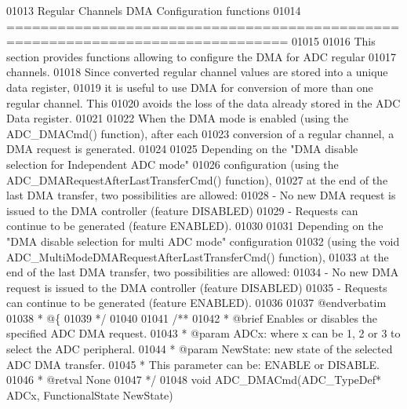 \begin{DoxyCode}
01013 \textcolor{comment}{                   Regular Channels DMA Configuration functions}
01014 \textcolor{comment}{ ===============================================================================  }
01015 \textcolor{comment}{}
01016 \textcolor{comment}{  This section provides functions allowing to configure the DMA for ADC regular }
01017 \textcolor{comment}{  channels.}
01018 \textcolor{comment}{  Since converted regular channel values are stored into a unique data register, }
01019 \textcolor{comment}{  it is useful to use DMA for conversion of more than one regular channel. This }
01020 \textcolor{comment}{  avoids the loss of the data already stored in the ADC Data register. }
01021 \textcolor{comment}{  }
01022 \textcolor{comment}{  When the DMA mode is enabled (using the ADC\_DMACmd() function), after each}
01023 \textcolor{comment}{  conversion of a regular channel, a DMA request is generated.}
01024 \textcolor{comment}{  }
01025 \textcolor{comment}{  Depending on the "DMA disable selection for Independent ADC mode" }
01026 \textcolor{comment}{  configuration (using the ADC\_DMARequestAfterLastTransferCmd() function), }
01027 \textcolor{comment}{  at the end of the last DMA transfer, two possibilities are allowed:}
01028 \textcolor{comment}{  - No new DMA request is issued to the DMA controller (feature DISABLED) }
01029 \textcolor{comment}{  - Requests can continue to be generated (feature ENABLED).}
01030 \textcolor{comment}{  }
01031 \textcolor{comment}{  Depending on the "DMA disable selection for multi ADC mode" configuration }
01032 \textcolor{comment}{  (using the void ADC\_MultiModeDMARequestAfterLastTransferCmd() function), }
01033 \textcolor{comment}{  at the end of the last DMA transfer, two possibilities are allowed:}
01034 \textcolor{comment}{  - No new DMA request is issued to the DMA controller (feature DISABLED) }
01035 \textcolor{comment}{  - Requests can continue to be generated (feature ENABLED).}
01036 \textcolor{comment}{}
01037 \textcolor{comment}{@endverbatim}
01038 \textcolor{comment}{  * @\{}
01039 \textcolor{comment}{  */}
01040 
01041  \textcolor{comment}{/**}
01042 \textcolor{comment}{  * @brief  Enables or disables the specified ADC DMA request.}
01043 \textcolor{comment}{  * @param  ADCx: where x can be 1, 2 or 3 to select the ADC peripheral.}
01044 \textcolor{comment}{  * @param  NewState: new state of the selected ADC DMA transfer.}
01045 \textcolor{comment}{  *          This parameter can be: ENABLE or DISABLE.}
01046 \textcolor{comment}{  * @retval None}
01047 \textcolor{comment}{  */}
01048 \textcolor{keywordtype}{void} ADC_DMACmd(ADC\_TypeDef* ADCx, FunctionalState NewState)

\end{DoxyCode}
